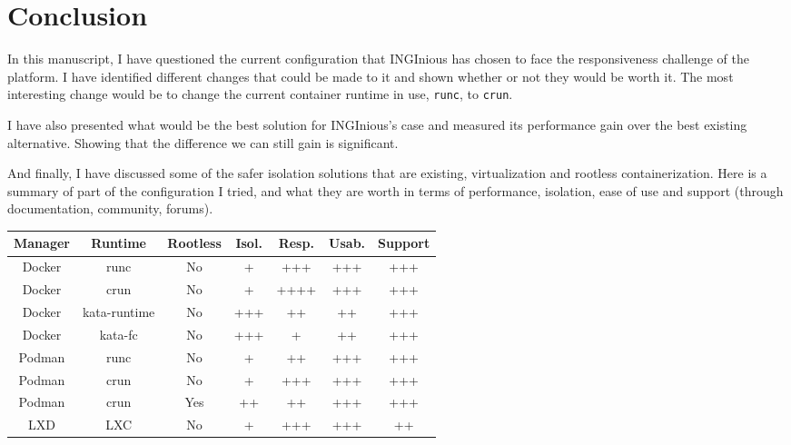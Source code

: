 \chapter{Conclusion}

In this manuscript, I have questioned the current configuration that INGInious has chosen to face the responsiveness challenge of the platform.  I have identified different changes that could be made to it and shown whether or not they would be worth it.  The most interesting change would be to change the current container runtime in use, \texttt{runc}, to \texttt{crun}.

I have also presented what would be the best solution for INGInious's case and measured its performance gain over the best existing alternative.  Showing that the difference we can still gain is significant.

And finally, I have discussed some of the safer isolation solutions that are existing, virtualization and rootless containerization.  Here is a summary of part of the configuration I tried, and what they are worth in terms of performance, isolation, ease of use and support (through documentation, community, forums).

\begin{center}
  \begin{tabular}{|ccc|c|c|c|c|}
    \hline
    \textbf{Manager} & \textbf{Runtime} & \textbf{Rootless} & \textbf{Isol.}\footnotemark & \textbf{Resp.}\footnotemark & \textbf{Usab.}\footnotemark & \textbf{Support} \\
    \hline
    \hline
    Docker & runc & No & + & +++ & +++ & +++ \\
    Docker & crun & No & + & ++++ & +++ & +++\\
    Docker & kata-runtime\footnotemark & No & +++ & ++ & ++ & +++\\
    Docker & kata-fc\footnotemark & No & +++ & + & ++ & +++\\
    Podman & runc & No & + & ++ & +++ & +++\\
    Podman & crun & No & + & +++ & +++ & +++\\
    Podman & crun & Yes & ++ & ++ & +++ & +++\\
    LXD & LXC & No & + & +++ & +++ & ++\\
    \hline
  \end{tabular}
\end{center}

